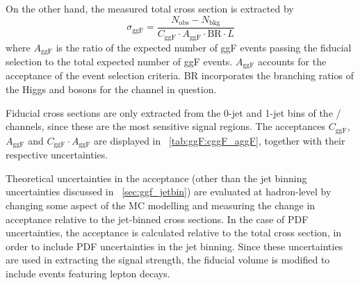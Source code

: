 On the other hand, the measured total cross section is extracted by
\begin{equation}
	\sigma_{\text{ggF}} = \frac{N_{\text{obs}} - N_{\text{bkg}}}{C_{\text{ggF}} \cdot A_{\text{ggF}} \cdot \text{BR} \cdot L}
	\label{eq:ggF:total_xs}
\end{equation}
where $A_{\text{ggF}}$ is the ratio of the expected number of ggF events passing the 
fiducial selection to the total expected number of ggF events. $A_{\text{ggF}}$ accounts 
for the acceptance of the event selection criteria. BR incorporates the branching 
ratios of the Higgs and \PW bosons for the channel in question.

Fiducial cross sections are only extracted from the 0-jet and 1-jet bins of the \emch/\mech 
channels, since these are the most sensitive signal regions. The acceptances 
$C_{\text{ggF}}$, $A_{\text{ggF}}$ and $C_{\text{ggF}} \cdot A_{\text{ggF}}$ are displayed 
in \Table~\ref{tab:ggF:cggF_aggF}, together with their respective uncertainties.

Theoretical uncertainties in the acceptance (other than the jet binning uncertainties 
discussed in \Section~\ref{sec:ggf_jetbin}) are evaluated at hadron-level by changing some 
aspect of the MC modelling and measuring the change in acceptance relative to the 
jet-binned cross sections. In the case of PDF uncertainties, the acceptance is calculated 
relative to the total cross section, in order to include PDF uncertainties in the jet 
binning. Since these uncertainties are used in extracting the signal strength, the fiducial 
volume is modified to include events featuring lepton \Ptau decays. 

